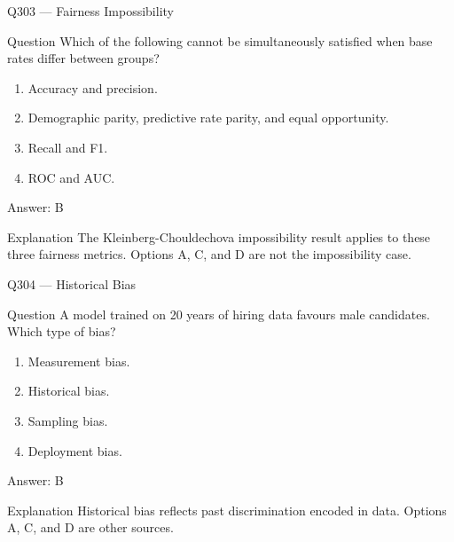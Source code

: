 \documentclass[aspectratio=169,8pt]{beamer}
\begin{document}
\begin{frame}{Q303 --- Fairness Impossibility}
\begin{block}{Question}
Which of the following cannot be simultaneously satisfied when base rates differ between groups?
\begin{enumerate}
\item Accuracy and precision.
\item Demographic parity, predictive rate parity, and equal opportunity.
\item Recall and F1.
\item ROC and AUC.
\end{enumerate}\end{block}
\begin{exampleblock}{Answer: B}\end{exampleblock}
\begin{block}{Explanation}
The Kleinberg-Chouldechova impossibility result applies to these three fairness metrics. Options A, C, and D are not the impossibility case.
\end{block}
\end{frame}

\begin{frame}{Q304 --- Historical Bias}
\begin{block}{Question}
A model trained on 20 years of hiring data favours male candidates. Which type of bias?
\begin{enumerate}
\item Measurement bias.
\item Historical bias.
\item Sampling bias.
\item Deployment bias.
\end{enumerate}\end{block}
\begin{exampleblock}{Answer: B}\end{exampleblock}
\begin{block}{Explanation}
Historical bias reflects past discrimination encoded in data. Options A, C, and D are other sources.
\end{block}
\end{frame}
\end{document}
